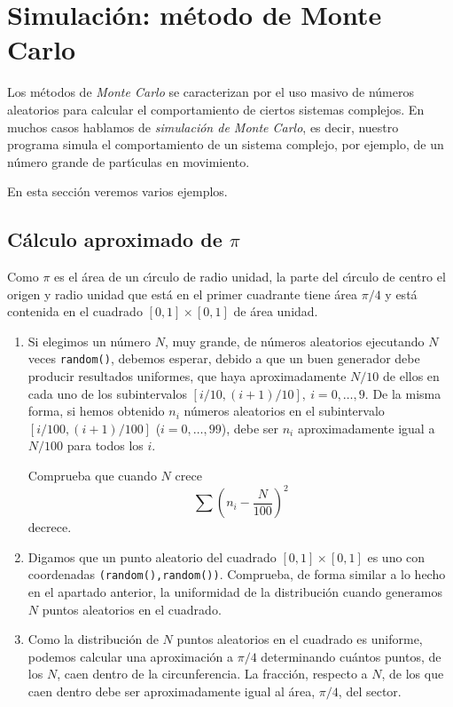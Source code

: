  
 
 
 
 
 
 
 
 
 
 \section{Simulaci\'on: m\'etodo de Monte Carlo}\label{monte}
 
Los m\'etodos de {\itshape Monte Carlo} se caracterizan por el uso masivo de
n\'umeros
aleatorios para calcular el comportamiento de ciertos sistemas complejos. En
muchos casos hablamos de {\itshape simulaci\'on de Monte Carlo}, es decir,
nuestro programa simula el comportamiento de un sistema complejo, por ejemplo,
de un n\'umero grande de part\'{\i}culas en movimiento. 

En esta secci\'on veremos varios ejemplos.


\subsection{ C\'alculo aproximado de $\pi$} 
Como $\pi$ es el \'area de un
c\'{\i}rculo de radio unidad, la parte del c\'{\i}rculo de centro el origen y
radio unidad que est\'a en el primer cuadrante tiene \'area $\pi/4$ y est\'a
contenida en el cuadrado $[0,1]\times [0,1]$ de \'area unidad.

\begin{ejer}
\begin{enumerate}
\item Si elegimos un n\'umero $N$, muy grande, de n\'umeros aleatorios
ejecutando $N$ veces  \lstinline|random()|, debemos esperar, debido a que un
buen generador debe producir resultados uniformes,  que haya aproximadamente
$N/10$  de ellos en cada uno de los subintervalos $[i/10,(i+1)/10],\
i=0,\dots,9.$ De la misma forma, si hemos obtenido $n_i$ n\'umeros aleatorios en
el subintervalo
$[i/100,(i+1)/100]$ ($i=0,\dots,99$), debe ser $n_i$ aproximadamente igual a
$N/100$ para todos los $i$. 

{\sc Comprueba} que cuando $N$ crece 
\[\sum(n_i-\frac{N}{100})^2\]
\noindent decrece.

\item Digamos que un punto aleatorio del cuadrado $[0,1]\times [0,1]$ es uno con
coordenadas 
\lstinline|(random(),random())|. {\sc Comprueba}, de forma similar a lo hecho en
el
apartado anterior,  la uniformidad de la distribuci\'on cuando generamos $N$
puntos aleatorios en el cuadrado.



\item \label{pi-mc}Como la distribuci\'on de $N$ puntos aleatorios en el
cuadrado es
uniforme, podemos  {\sc calcular} una aproximaci\'on a $\pi/4$ determinando
 cu\'antos puntos, de los $N$,   caen dentro
de la circunferencia. La fracci\'on, respecto a $N$,  de los que caen dentro
debe ser
aproximadamente igual al \'area, $\pi/4$,  del sector. 


\end{enumerate}
 
 \end{ejer}
 
